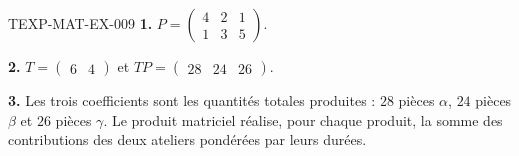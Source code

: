 \begin{corrige}{TEXP-MAT-EX-009}
\textbf{1.} $P=\begin{pmatrix}4&2&1\\1&3&5\end{pmatrix}$.

\textbf{2.} $T=\begin{pmatrix}6&4\end{pmatrix}$ et
$TP=\begin{pmatrix}28&24&26\end{pmatrix}$.

\textbf{3.} Les trois coefficients sont les quantités totales produites :
$28$ pièces $\alpha$, $24$ pièces $\beta$ et $26$ pièces $\gamma$. Le produit
matriciel réalise, pour chaque produit, la somme des contributions des deux
ateliers pondérées par leurs durées.
\end{corrige}
